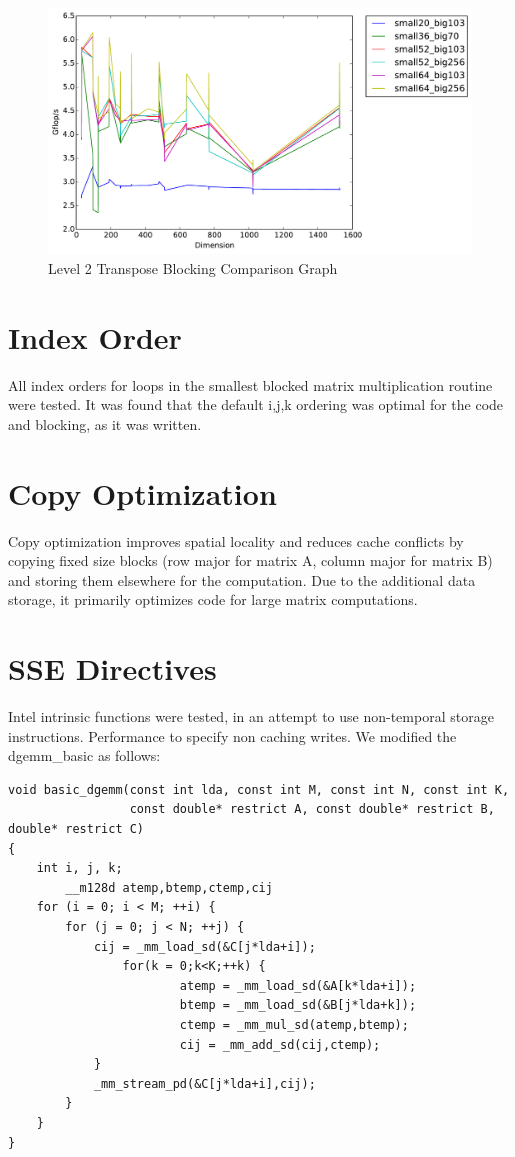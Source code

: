 \documentclass[letterpaper]{article}	 %
\begin{document}
\begin{figure}[H]
\centering
  \centering
  \includegraphics[width=.6\linewidth]{timing-blocksizes-l2transpose.pdf}
  \caption{Level 2 Transpose Blocking Comparison Graph}
  \label{fig:l2t}
  \end{figure}


\section{Index Order}
All index orders for loops in the smallest blocked matrix multiplication routine were tested. It was found that the default i,j,k ordering was optimal for the code and blocking, as it was written.


\section{Copy Optimization}
Copy optimization improves spatial locality and reduces cache conflicts by copying fixed size blocks (row major for matrix A, column major for matrix B) and storing them elsewhere for the computation. Due to the additional data storage, it primarily optimizes code for large matrix computations. 


\section{SSE Directives}

Intel intrinsic functions were tested, in an attempt to use non-temporal storage instructions. Performance to specify non caching writes. We modified the dgemm\_basic as follows:

\begin{verbatim}
void basic_dgemm(const int lda, const int M, const int N, const int K,
                 const double* restrict A, const double* restrict B, double* restrict C)
{
    int i, j, k;
        __m128d atemp,btemp,ctemp,cij
    for (i = 0; i < M; ++i) {
        for (j = 0; j < N; ++j) {
            cij = _mm_load_sd(&C[j*lda+i]);
                for(k = 0;k<K;++k) {
                        atemp = _mm_load_sd(&A[k*lda+i]);
                        btemp = _mm_load_sd(&B[j*lda+k]);
                        ctemp = _mm_mul_sd(atemp,btemp);
                        cij = _mm_add_sd(cij,ctemp);
            }
            _mm_stream_pd(&C[j*lda+i],cij);
        }
    }
}
\end{verbatim}
\end{document}
